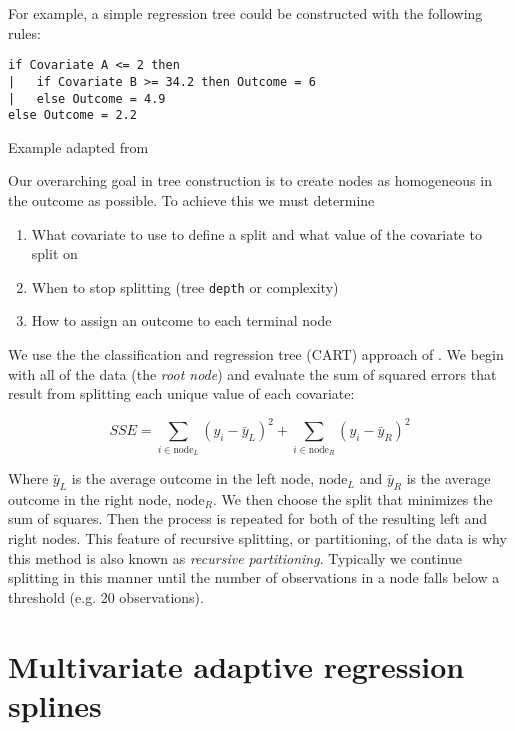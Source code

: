 \documentclass[12pt]{article}
\begin{document}
For example, a simple regression tree could be constructed with the following rules:
\begin{verbatim}
if Covariate A <= 2 then
|   if Covariate B >= 34.2 then Outcome = 6
|   else Outcome = 4.9
else Outcome = 2.2
\end{verbatim}

Example adapted from \cite{kuhn}

Our overarching goal in tree construction is to create nodes as homogeneous in the outcome as possible. To achieve this we must determine

\begin{enumerate}
  \item What covariate to use to define a split and what value of the covariate to split on
  \item When to stop splitting (tree \texttt{depth} or complexity)
  \item How to assign an outcome to each terminal node
\end{enumerate}

We use the the classification and regression tree (CART) approach of \cite{CART}. We begin with all of the data (the \emph{root node}) and evaluate the sum of squared errors that result from splitting each unique value of each covariate:

\begin{equation}
  SSE = \sum_{i \in \text{node}_{L}} (y_{i} - \bar{y}_{L})^2 + \sum_{i \in \text{node}_{R}} (y_{i} - \bar{y}_{R})^2 
\end{equation} 

Where $\bar{y}_{L}$ is the average outcome in the left node, $\text{node}_{L}$ and $\bar{y}_{R}$ is the average outcome in the right node, $\text{node}_{R}$. We then choose the split that minimizes the sum of squares. Then the process is repeated for both of the resulting left and right nodes. This feature of recursive splitting, or partitioning, of the data is why this method is also known as \emph{recursive partitioning}. Typically we continue splitting in this manner until the number of observations in a node falls below a threshold (e.g. 20 observations).









\section{Multivariate adaptive regression splines} %
\label{sec:mars}
\end{document}

